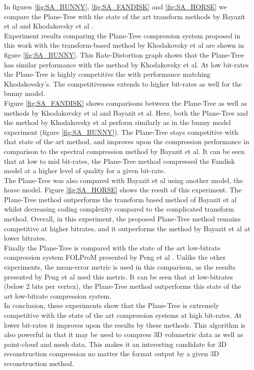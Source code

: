In figures \ref{fig:SA_BUNNY}, \ref{fig:SA_FANDISK} and \ref{fig:SA_HORSE} we compare the Plane-Tree with the state of the art transform methods by Bayazit et al \cite{Bayazit103DMesh} and Khodakovsky et al \cite{Khodakovsky00Progressive}. \\

Experiment results comparing the Plane-Tree compression system proposed in this work with the transform-based method by Khodakovsky et al are shown in figure \ref{fig:SA_BUNNY}. This Rate-Distortion graph shows that the Plane-Tree has similar performance with the method by Khodakovsky et al. At low bit-rates the Plane-Tree is highly competitive the with performance matching Khodakovsky's. The competitiveness extends to higher bit-rates as well for the bunny model. \\

Figure \ref{fig:SA_FANDISK} shows comparisons between the Plane-Tree as well as methods by Khodakovsky et al and Bayazit et al. Here, both the Plane-Tree and the method by Khodakovsky et al perform similarly as in the bunny model experiment (figure \ref{fig:SA_BUNNY}). The Plane-Tree stays competitive with that state of the art method, and improves upon the compression performance in comparison to the spectral compression method by Bayazit et al. It can be seen that at low to mid bit-rates, the Plane-Tree method compressed the Fandisk model at a higher level of quality for a given bit-rate. \\

The Plane-Tree was also compared with Bayazit et al using another model, the horse model. Figure \ref{fig:SA_HORSE} shows the result of this experiment. The Plane-Tree method outperforms the transform based method of Bayazit et al whilst decreasing coding complexity compared to the complicated transform method. Overall, in this experiment, the proposed Plane-Tree method remains competitive at higher bitrates, and it outperforms the method by Bayazit et al at lower bitrates. \\

Finally the Plane-Tree is compared with the state of the art low-bitrate compression system FOLProM presented by Peng et al \cite{Peng10Feature}. Unlike the other experiments, the mean-error metric is used in this comparison, as the results presented by Peng et al used this metric. It can be seen that at low-bitrates (below 2 bits per vertex), the Plane-Tree method outperforms this state of the art low-bitrate compression system. \\


In conclusion, these experiments show that the Plane-Tree is extremely competitive with the state of the art compression systems at high bit-rates. At lower bit-rates it improves upon the results by these methods. This algorithm is also powerful in that it may be used to compress 3D volumetric data as well as point-cloud and mesh data. This makes it an interesting candidate for 3D reconstruction compression no matter the format output by a given 3D reconstruction method. \\